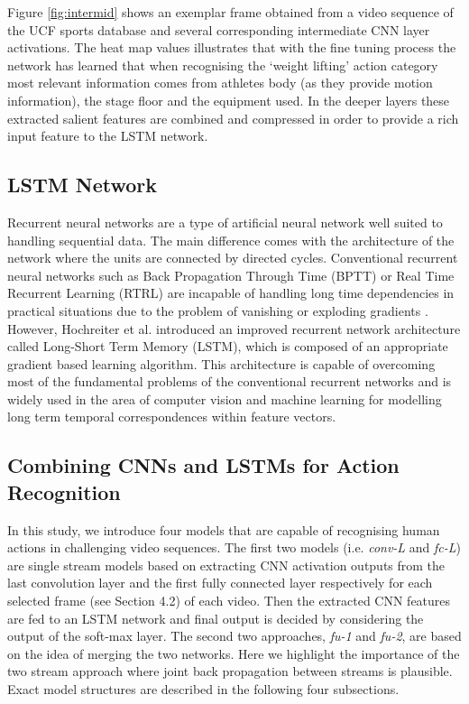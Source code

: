 \documentclass[10pt,twocolumn,letterpaper]{article}
\begin{document}
   Figure \ref{fig:intermid} shows an exemplar frame obtained from a video sequence of the UCF sports database and several corresponding intermediate CNN layer activations. The heat map values illustrates that with the fine tuning process the network has learned that when recognising the `weight lifting' action category most relevant information comes from athletes body (as they provide motion information), the stage floor and the equipment used. In the deeper layers these extracted salient features are combined and compressed in order to provide a rich input feature to the LSTM network.
   
   
\subsection{LSTM Network}

Recurrent neural networks are a type of artificial neural network well suited to handling sequential data. The main difference comes with the architecture of the network where the units are connected by directed cycles. Conventional recurrent neural networks such as Back Propagation Through Time (BPTT) \cite{BPTT1992} or Real Time Recurrent Learning (RTRL) \cite{RNN1989} are incapable of handling long time dependencies in practical situations due to the problem of vanishing or exploding gradients \cite{vanishGrad1994}. However, Hochreiter et al.\cite{LSTM1997} introduced an improved recurrent network architecture called Long-Short Term Memory (LSTM), which is composed of an appropriate gradient based learning algorithm. This architecture is capable of overcoming most of the fundamental problems of the conventional recurrent networks and is widely used in the area of computer vision and machine learning for modelling long term temporal correspondences within feature vectors.%

\subsection{Combining CNNs and LSTMs for Action Recognition}

 In this study, we introduce four models that are capable of recognising human actions in challenging video sequences. The first two models (i.e. \textit{conv-L} and \textit{fc-L}) are single stream models based on extracting CNN activation outputs from the last convolution layer and the first fully connected layer respectively for each selected frame (see Section 4.2) of each video. Then the extracted CNN features are fed to an LSTM network and final output is decided by considering the  output of the soft-max layer. The second two approaches, \textit{fu-1} and \textit{fu-2}, are based on the idea of merging the two networks. Here we highlight the importance of the two stream approach where joint back propagation between streams is plausible. Exact model structures are described in the following four subsections.   
 
\end{document}
